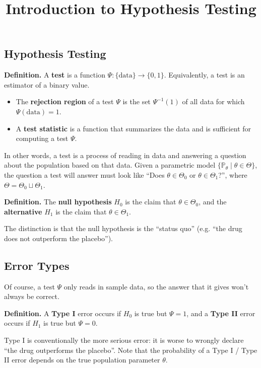 \title{Introduction to Hypothesis Testing}



\subsection{Hypothesis Testing}

\textbf{Definition.}
A \textbf{test} is a function $\Psi: \{\mathrm{data}\} \to \{0, 1\}$.
Equivalently, a test is an estimator of a binary value.
\begin{itemize}
    \item The \textbf{rejection region} of a test $\Psi$
    is the set $\Psi^{-1}(1)$ of all data for which $\Psi(\mathrm{data}) = 1$.
    \item A \textbf{test statistic} is a function that summarizes the data
    and is sufficient for computing a test $\Psi$.
\end{itemize}

In other words, a test is a process of reading in data
and answering a question about the population based on that data.
Given a parametric model $\{\mathbb{P}_{\theta} \mid \theta \in \Theta\}$,
the question a test will answer must look like
``Does $\theta \in \Theta_0$ or $\theta \in \Theta_1$?'',
where $\Theta = \Theta_0 \sqcup \Theta_1$.

\textbf{Definition.} The \textbf{null hypothesis} $H_0$ is the claim that $\theta \in \Theta_0$,
and the \textbf{alternative} $H_1$ is the claim that $\theta \in \Theta_1$.

The distinction is that the null hypothesis is the ``status quo'' (e.g.
``the drug does not outperform the placebo'').

\subsection{Error Types}

Of course, a test $\Psi$ only reads in sample data,
so the answer that it gives won't always be correct.

\textbf{Definition.} A \textbf{Type I} error occurs
if $H_0$ is true but $\Psi = 1$, and
a \textbf{Type II} error occurs
if $H_1$ is true but $\Psi = 0$.

Type I is conventionally the more serious error:
it is worse to wrongly declare ``the drug outperforms the placebo''.
Note that the probability of a Type I / Type II error
depends on the true population parameter $\theta$.

